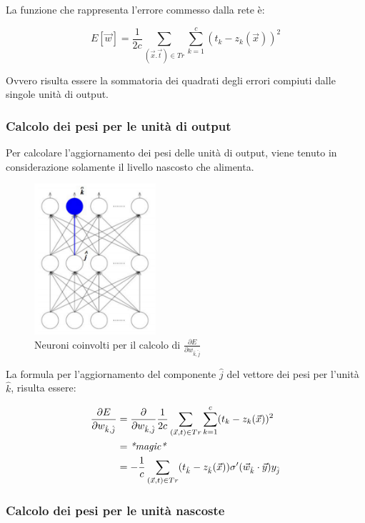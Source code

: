 La funzione che rappresenta l'errore commesso dalla rete è:

$$
E[\vec{w}] = \frac{1}{2c} \sum\limits_{(\vec{x}. \vec{t}) \in Tr} \sum\limits_{k=1}^c (t_k - z_k(\vec{x}))^2
$$

Ovvero risulta essere la sommatoria dei quadrati degli errori compiuti dalle singole unità di output.

\subsubsection{Calcolo dei pesi per le unità di output}\label{calcolo-dei-pesi-per-le-unituxe0-di-output}

Per calcolare l'aggiornamento dei pesi delle unità di output, viene tenuto in considerazione solamente il livello nascosto che alimenta.

\begin{figure}[htbp]
\centering
\includegraphics[width=0.4\textwidth]{./notes/immagini/l10-wkj.png}
\caption{Neuroni coinvolti per il calcolo di $\frac{\partial E}{\partial w_{\hat{k},\hat{j}}}$}
\end{figure}

La formula per l'aggiornamento del componente $\hat{j}$ del vettore dei pesi per l'unità $\hat{k}$, risulta essere:

\begin{align*}
\frac{\partial E}{\partial w_{\hat{k},\hat{j}}} &= \frac{\partial}{\partial w_{\hat{k},\hat{j}}} \frac{1}{2c} \sum_{(\vec{x},t) \in Tr} \sum\limits_{k=1}^c (t_k - z_k(\vec{x}))^2 \\
 &= \text{\textit{*magic*}} \\
 &= - \frac{1}{c} \sum_{(\vec{x},t) \in Tr} (t_{\hat{k}} - z_{\hat{k}}(\vec{x}))\sigma ' (\vec{w}_{\hat{k}}  \cdot \vec{y}) y_{\hat{j}} 
\end{align*}

\subsubsection{Calcolo dei pesi per le unità nascoste}\label{calcolo-dei-pesi-per-le-unituxe0-nascoste}

